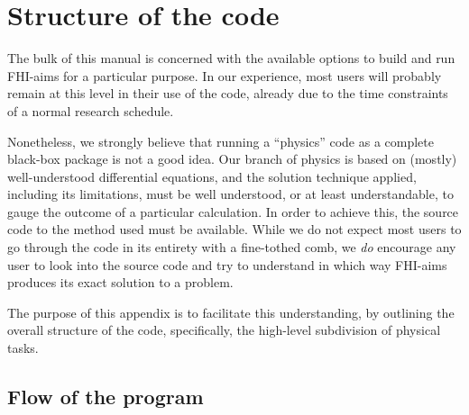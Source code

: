 \chapter{Structure of the code}
\label{appendix_structure}

The bulk of this manual is concerned with the available options to
build and run FHI-aims for a particular purpose. In our experience,
most users will probably remain at this level in their use of the
code, already due to the time constraints of a normal research
schedule. 

Nonetheless, we strongly believe that running a ``physics'' code as a
complete black-box package is not a good idea. Our branch of physics
is based on (mostly) well-understood differential equations, and the
solution technique applied, including its limitations, must be well
understood, or at least understandable, to gauge the outcome of a
particular calculation. In order to achieve this, the source code to
the method used must be available. While we do not expect most users
to go through the code in its entirety with a fine-tothed comb, we
\emph{do} encourage any user to look into the source code and try to
understand in which way FHI-aims produces its exact solution to a
problem. 

The purpose of this appendix is to facilitate this understanding, by
outlining the overall structure of the code, specifically, the
high-level subdivision of physical tasks.

\section{Flow of the program}

